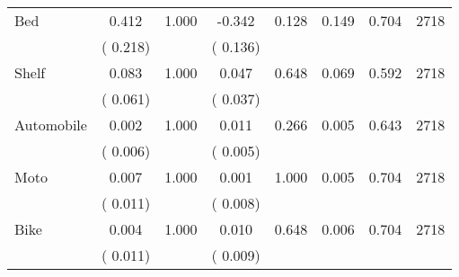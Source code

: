 \begin{tabular}{l*{7}{c}}
 Bed       &              0.412       &        1.000  &             -0.342       &        0.128  &              0.149       &              0.704 &  2718 \\ 
                       &       (       0.218)             &                               &       (       0.136)                     &                               &                                               &                                &                      \\ 

 Shelf       &              0.083       &        1.000  &              0.047       &        0.648  &              0.069       &              0.592 &  2718 \\ 
                       &       (       0.061)             &                               &       (       0.037)                     &                               &                                               &                                &                      \\ 

 Automobile       &              0.002       &        1.000  &              0.011       &        0.266  &              0.005       &              0.643 &  2718 \\ 
                       &       (       0.006)             &                               &       (       0.005)                     &                               &                                               &                                &                      \\ 

 Moto       &              0.007       &        1.000  &              0.001       &        1.000  &              0.005       &              0.704 &  2718 \\ 
                       &       (       0.011)             &                               &       (       0.008)                     &                               &                                               &                                &                      \\ 

 Bike       &              0.004       &        1.000  &              0.010       &        0.648  &              0.006       &              0.704 &  2718 \\ 
                       &       (       0.011)             &                               &       (       0.009)                     &                               &                                               &                                &                      \\ 


\end{tabular}
